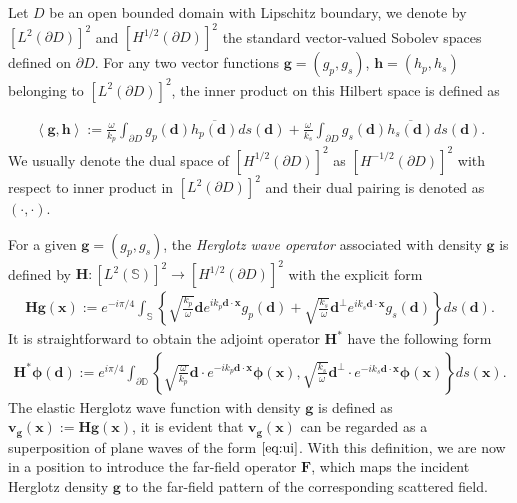 \documentclass[11pt,reqno,twoside]{amsart}
\theoremstyle{definition}
\theoremstyle{remark}
\numberwithin{equation}{section}
\begin{document}
Let $D$ be an open bounded domain with Lipschitz boundary, we denote by $\left[L^2\left(\partial D\right) \right] ^2$ and $\left[H^{1/2} \left(\partial D\right) \right] ^2$ the standard vector-valued Sobolev spaces defined on $\partial D$. For any two vector functions $\mathbf{g}=\left( g_p,g_s\right)$, $\mathbf{h}=\left( h_p,h_s\right)$ belonging to $ \left[L^2\left(\partial D\right) \right] ^2$, the inner product on this Hilbert space is defined as

	\begin{align*}%
		\left\langle \mathbf{g},\mathbf{h}\right\rangle := \frac{\omega}{k_p}\int_{\partial D} g_p(\mathbf d) \overline{h_p(\mathbf d)}ds(\mathbf d)+\frac{\omega}{k_s}\int_{\partial D} g_s(\mathbf d) \overline{h_s(\mathbf d)}ds(\mathbf d).
	\end{align*}
We usually denote the dual space of  $\left[H^{1/2}\left(\partial D\right) \right] ^2$ as  $\left[H^{-1/2}\left(\partial D\right) \right] ^2$ with respect to inner product in $\left[L^2\left(\partial D\right) \right] ^2$ and their dual pairing is denoted as $\left( \cdot,\cdot\right) $.

For a given $\mathbf{g}=\left( g_p, g_s\right)$, the \emph{Herglotz wave operator} associated with density $\mathbf{g}$ is defined by $\mathbf H: \left[L^2\left(\mathbb S\right) \right] ^2 \to \left[H^{1/2}\left(\partial D\right) \right] ^2$ with the explicit form
	 	\begin{align}\label{eq:HerglotzOperatorD}
	 		\mathbf{Hg}\left( \mathbf x\right) :=e^{-i\pi /4} \int_{\mathbb S}  \left\lbrace \sqrt{\frac{k_p}{\omega}}\mathbf{d} e^{ik_p\mathbf{d}\cdot\mathbf{x}}g_p(\mathbf{d})+\sqrt{\frac{k_s}{\omega}}\mathbf{d}^{\perp} e^{ik_s\mathbf{d}\cdot\mathbf{x}}g_s(\mathbf{d})\right\rbrace ds(\mathbf{d}).
	 	\end{align}
	 	It is straightforward to obtain the adjoint operator $\mathbf H^*$ have the following form
	 	\begin{align*}\label{eq:HerglotzOperatorDA}
	 		\mathbf{H^* \phi }\left( \mathbf d\right) :=e^{i\pi /4} \int_{\partial \mathbb D}  \left\lbrace \sqrt{\frac{\omega}{k_p}}\mathbf{d} \cdot e^{-ik_p\mathbf{d}\cdot\mathbf{x}}\mathbf{\phi}\left( \mathbf{x}\right)  , \sqrt{\frac{k_s}{\omega}}\mathbf{d}^{\perp} \cdot e^{-ik_s\mathbf{d}\cdot\mathbf{x}}\mathbf{\phi}\left( \mathbf{x}\right)\right\rbrace ds(\mathbf{x}).
	 	\end{align*}
The elastic Herglotz wave function with density $\mathbf{g}$ is defined as $\mathbf{v_g}(\mathbf{x}):= \mathbf{Hg}\left( \mathbf x\right) $, it is evident that $\mathbf{v_g}(\mathbf{x})$ can be regarded as a superposition of plane waves of the form $\eqref{eq:ui}$. With this definition, we are now in a position to introduce the far-field operator $\mathbf{F}$, which maps the incident Herglotz density $\mathbf{g}$ to the far-field pattern of the corresponding scattered field.
		
\end{document}
